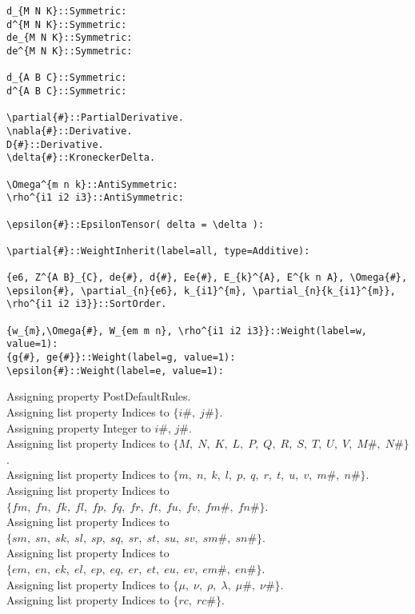 \documentclass[11pt]{article}
\begin{document}
{\begin{verbatim}
d_{M N K}::Symmetric:
d^{M N K}::Symmetric:
de_{M N K}::Symmetric:
de^{M N K}::Symmetric:

d_{A B C}::Symmetric:
d^{A B C}::Symmetric:

\partial{#}::PartialDerivative.
\nabla{#}::Derivative.
D{#}::Derivative.
\delta{#}::KroneckerDelta.

\Omega^{m n k}::AntiSymmetric:
\rho^{i1 i2 i3}::AntiSymmetric:

\epsilon{#}::EpsilonTensor( delta = \delta ):

\partial{#}::WeightInherit(label=all, type=Additive):

{e6, Z^{A B}_{C}, de{#}, d{#}, Ee{#}, E_{k}^{A}, E^{k n A}, \Omega{#}, \epsilon{#}, \partial_{n}{e6}, k_{i1}^{m}, \partial_{n}{k_{i1}^{m}},  \rho^{i1 i2 i3}}::SortOrder.

{w_{m},\Omega{#}, W_{em m n}, \rho^{i1 i2 i3}}::Weight(label=w, value=1):
{g{#}, ge{#}}::Weight(label=g, value=1):
\epsilon{#}::Weight(label=e, value=1):
\end{verbatim}}
Assigning property PostDefaultRules.
\\
Assigning list property Indices to $\{i\#,\; j\#\}$.
\\
Assigning property Integer to $i\#$, $j\#$.
\\
Assigning list property Indices to $\{M,\; N,\; K,\; L,\; P,\; Q,\; R,\; S,\; T,\; U,\; V,\; M\#,\; N\#\}$.
\\
Assigning list property Indices to $\{m,\; n,\; k,\; l,\; p,\; q,\; r,\; t,\; u,\; v,\; m\#,\; n\#\}$.
\\
Assigning list property Indices to $\{fm,\; fn,\; fk,\; fl,\; fp,\; fq,\; fr,\; ft,\; fu,\; fv,\; fm\#,\; fn\#\}$.
\\
Assigning list property Indices to $\{sm,\; sn,\; sk,\; sl,\; sp,\; sq,\; sr,\; st,\; su,\; sv,\; sm\#,\; sn\#\}$.
\\
Assigning list property Indices to $\{em,\; en,\; ek,\; el,\; ep,\; eq,\; er,\; et,\; eu,\; ev,\; em\#,\; en\#\}$.
\\
Assigning list property Indices to $\{\mu,\; \nu,\; \rho,\; \lambda,\; \mu\#,\; \nu\#\}$.
\\
Assigning list property Indices to $\{rc,\; rc\#\}$.
\end{document}
